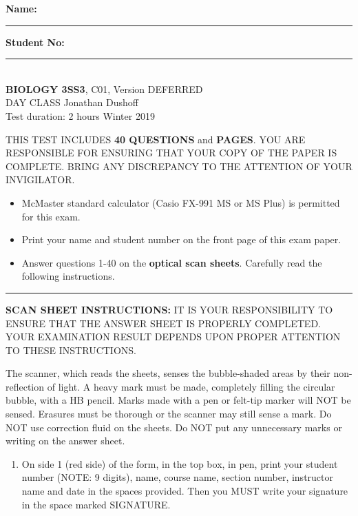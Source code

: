 

\textbf{Name:} \rule{5cm}{1pt} \hfill \textbf{Student No:} \rule{5cm}{1pt} \\

\bigskip\noindent \hfill {\large {\bf BIOLOGY 3SS3}, C01,
	Version DEFERRED
} \hspace*{\fill} \\
DAY CLASS  \hfill Jonathan Dushoff \\
Test duration: 2 hours
\hfill Winter 2019

{\small

\medskip\noindent THIS TEST INCLUDES {\bf 40 QUESTIONS} and \textbf{\pageref{LastPage} PAGES}. YOU ARE RESPONSIBLE FOR ENSURING THAT YOUR COPY OF THE PAPER IS COMPLETE. BRING ANY DISCREPANCY TO THE ATTENTION OF YOUR INVIGILATOR. 

\begin{itemize}
\item McMaster standard calculator (Casio FX-991 MS or MS Plus) is permitted for this exam.
\item Print your name and student number on the front page of this exam paper.
\item Answer questions 1-40 on the \textbf{optical scan sheets}.  Carefully read the following instructions.
\end{itemize}
\hrule
\bigskip\textbf{SCAN SHEET INSTRUCTIONS:} 
IT IS YOUR RESPONSIBILITY TO ENSURE THAT THE ANSWER SHEET IS PROPERLY COMPLETED. YOUR EXAMINATION RESULT DEPENDS UPON PROPER ATTENTION TO THESE INSTRUCTIONS.

The scanner, which reads the sheets, senses the bubble-shaded areas by their non-reflection of light.  A heavy mark must be made, completely filling the circular bubble, with a HB pencil.  Marks made with a pen or felt-tip marker will NOT be sensed.  Erasures must be thorough or the scanner may still sense a mark.  Do NOT use correction fluid on the sheets.  Do NOT put any unnecessary marks or writing on the answer sheet.

\begin{enumerate}

\item On side 1 (red side) of the form, in the top box, in pen, print your student number (NOTE: 9 digits), name, course name, section number, instructor name and date in the spaces provided.  Then you MUST write your signature in the space marked SIGNATURE.


\end{enumerate}}
